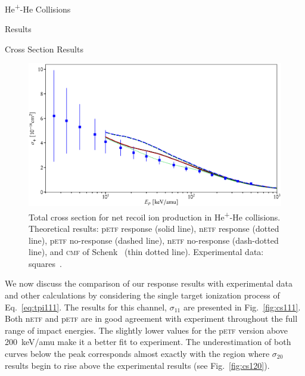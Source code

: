 \documentclass[letterpaper, 11 pt]{report}
\begin{document}
\begin{chapter}{\texorpdfstring{He\textsuperscript{+}}{He+}-He Collisions \label{chap:hephe}}
\begin{section}{Results \label{sec:hephe-disc}}
\begin{subsection}{Cross Section Results \label{sec:hephe-res}}
         \begin{figure}[t]
            \centering
            \includegraphics[width = \linewidth]{./images/hephe-cross/netRecoil.eps}
            \caption[Total cross section for net recoil ion production in He\textsuperscript{+}-He
                     collisions.]
                    {Total cross section for net recoil ion production in He\textsuperscript{+}-He
                     collisions.
                     Theoretical results: p\textsc{etf} response (solid line), n\textsc{etf} response
                                          (dotted line), p\textsc{etf} no-response (dashed line),
                                          n\textsc{etf} no-response (dash-dotted line), and
                                          \textsc{cmf} of Schenk~\cite{geraldDiss}
                                          (thin dotted line).
                     Experimental data: squares~\cite{RGID85}. \label{fig:recoil}}
         \end{figure}

         We now discuss the comparison of our response results with experimental data and other
         calculations by considering the single target ionization process of Eq.~\eqref{eq:tpi111}. The
         results for this channel, $\sigma_{11}$ are presented in Fig.~\ref{fig:cs111}. Both
         n\textsc{etf} and p\textsc{etf} are in good agreement with experiment throughout the full range
         of impact energies. The slightly lower values for the p\textsc{etf} version above 200~keV/amu
         make it a better fit to experiment. The underestimation of both curves below the peak
         corresponds almost exactly with the region where $\sigma_{20}$ results begin to rise above the
         experimental results (see Fig.~\ref{fig:cs120}).


\end{subsection}
\end{section}
\end{chapter}
\end{document}
